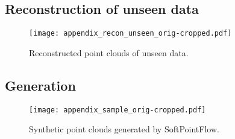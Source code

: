 \documentclass{article}
\begin{document}
\newpage
\subsection{Reconstruction of unseen data}
\begin{figure}[h]
	\centering
	\texttt{[image: appendix\_recon\_unseen\_orig-cropped.pdf]}
    \caption{Reconstructed point clouds of unseen data.}
	\label{fig:appendix_fig_5}
\end{figure}

\newpage
\subsection{Generation}
\begin{figure}[h]
	\centering
	\texttt{[image: appendix\_sample\_orig-cropped.pdf]}
    \caption{Synthetic point clouds generated by SoftPointFlow.}
	\label{fig:appendix_fig_6}
\end{figure}
\end{document}
